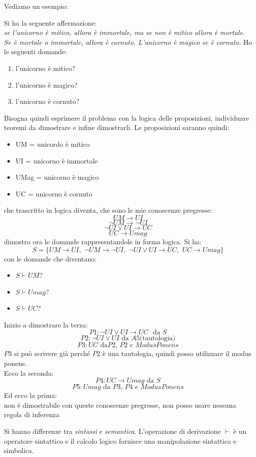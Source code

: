 \documentclass[a4paper,12pt, oneside]{book}
\begin{document}
Vediamo un esempio:
\begin{esempio}
Si ha la seguente affermazione:\\
\textit{se l'unicorno è mitico, allora è immortale, ma se non è mitico allora è mortale. Se è mortale o immortale, allora è cornuto. L'unicorno è magico se è cornuto.} Ho le seguenti domande:
\begin{enumerate}
\item l'unicorno è mitico?
\item l'unicorno è magico?
\item l'unicorno è cornuto?
\end{enumerate}
Bisogna quindi esprimere il problema con la logica delle proposizioni, individuare teoremi da dimostrare e infine dimostrarli. Le proposizioni saranno quindi:
\begin{itemize}
\item UM = unicordo è mitico
\item UI = unicorno è immortale
\item UMag = unicorno è magico
\item UC = unicorno è cornuto
\end{itemize}
che trascritto in logica diventa, che sono le mie conoscenze pregresse:
$$UM\to UI$$
$$\neg UM \to \neg UI$$
$$\neg UI\vee UI\to UC$$
$$UC\to Umag$$
dimostro ora le domande rappresentandole in forma logica. Si ha:
$$S=\{UM\to UI,\,\,\neg UM \to \neg UI,\,\,\neg UI\vee UI\to UC,\,\,UC\to Umag\}$$
con le domande che diventano:
\begin{itemize}
\item $S\vdash UM$?
\item $S\vdash Umag$?
\item $S\vdash UC$?
\end{itemize}
\newpage
Inizio a dimostrare la terza:\\
$$P1: \neg UI\vee UI\to UC\,\, \mbox{ da }S$$
$$P2: \neg UI\vee UI \mbox{ da }A5 \mbox{(tautologia)}$$
$$P3: UC\mbox{ da}P2,\,P2\,\, e\,\, ModusPonens$$
$P3$ si può scrivere già perché $P2$ è una tautologia, quindi posso utilizzare il modus ponens.\\
Ecco la seconda:\\
$$P4: UC\to Umag \mbox{ da }S$$
$$P5: Umag \mbox{ da }P3,\,P4\,\, e\,\, ModusPonens$$
Ed ecco la prima:\\
non è dimostrabile con queste conoscenze pregresse, non posso usare nessuna regola di inferenza
\end{esempio}
Si hanno differenze tra \textit{sintassi} e \textit{semantica}. L'operazione di derivazione $\vdash$ è un operatore sintattico e il calcolo logico fornisce una manipolazione sintattica e simbolica.\\ 
\end{document}
